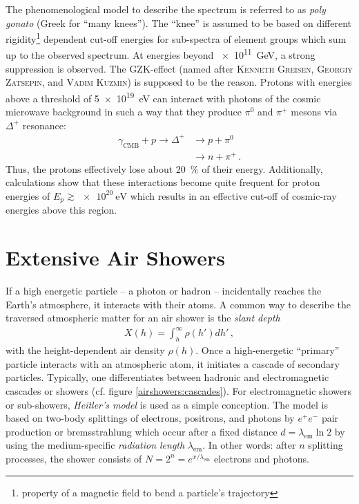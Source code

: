 The phenomenological model to describe the spectrum is referred to as \textit{poly gonato} (Greek for \enquote{many knees}). The \enquote{knee} is assumed to be based on different rigidity\footnote{property of a magnetic field to bend a particle's trajectory} dependent cut-off energies for sub-spectra of element groups which sum up to the observed spectrum. \cite{cosmicrays:hoerandel, cosmicrays:shapiro} At energies beyond \SI{e11}{\giga\electronvolt}, a strong suppression is observed. The GZK-effect (named after \textsc{Kenneth Greisen}, \textsc{Georgiy Zatsepin}, and \textsc{Vadim Kuzmin}) is supposed to be the reason. Protons with energies above a threshold of \SI{5e19}{\electronvolt} can interact with photons of the cosmic microwave background in such a way that they produce $\pi^0$ and $\pi^+$ mesons via $\Delta^+$ resonance:
\begin{subequations}
	\begin{align}
	\gamma_\text{CMB} + p \rightarrow \Delta^+ &\rightarrow p + \pi^0\\
	&\rightarrow n + \pi^+\,.
	\end{align}
\end{subequations}
Thus, the protons effectively lose about \SI{20}{\percent} of their energy. Additionally, calculations show that these interactions become quite frequent for proton energies of $E_p\gtrsim\SI{e20}{\electronvolt}$ which results in an effective cut-off of cosmic-ray energies above this region. \cite{cosmicrays:gzk}

\section{Extensive Air Showers}

If a high energetic particle -- a photon or hadron -- incidentally reaches the Earth's atmosphere, it interacts with their atoms. A common way to describe the traversed atmospheric matter for an air shower is the \textit{slant depth}
\begin{align}
X(h) = \int_{h}^{\infty}\rho(h')dh'\,,
\end{align}
with the height-dependent air density $\rho(h)$. Once a high-energetic \enquote{primary} particle interacts with an atmospheric atom, it initiates a cascade of secondary particles. Typically, one differentiates between hadronic and electromagnetic cascades or showers (cf. figure \ref{airshowers:cascades}). For electromagnetic showers or sub-showers, \textit{Heitler's model} is used as a simple conception. The model is based on two-body splittings of electrons, positrons, and photons by $e^+ e^-$ pair production or bremsstrahlung which occur after a fixed distance $d=\lambda_\text{em}\ln{2}$ by using the medium-specific \textit{radiation length} $\lambda_\text{em}$. In other words: after $n$ splitting processes, the shower consists of $N = 2^n = e^{x/\lambda_\text{em}}$ electrons and photons.\\

